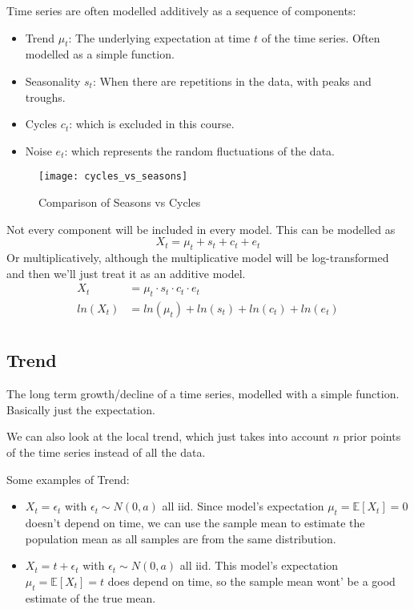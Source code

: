     Time series are often modelled additively as a sequence of components: 
    \begin{itemize} 
        \item Trend \(\mu_t\): The underlying expectation at time \(t\) of the time series. Often modelled as a simple function.
        \item Seasonality \(s_t\): When there are repetitions in the data, with peaks and troughs.
        \item Cycles \(c_t\): which is excluded in this course.
        \item Noise \(e_t\): which represents the random fluctuations of the data.
    \end{itemize} 
    \begin{figure}[t]
        \centering
        \texttt{[image: cycles\_vs\_seasons]}
        \caption{Comparison of Seasons vs Cycles}
    \end{figure}

    Not every component will be included in every model.
    This can be modelled as 
    \begin{equation*}
        X_t = \mu_t + s_t + c_t + e_t
    \end{equation*}
    Or multiplicatively, although the multiplicative model will be log-transformed and then we'll just treat it as an additive model.
    \begin{equation*}
        \begin{aligned}
            X_t &= \mu_t \cdot s_t \cdot c_t \cdot e_t \\
            ln(X_t) &= ln(\mu_t) + ln(s_t) + ln(c_t) + ln(e_t) \\
        \end{aligned}
    \end{equation*}
    \subsection{Trend}
    The long term growth/decline of a time series, modelled with a simple function. Basically just the expectation.

    We can also look at the local trend, which just takes into account \(n\) prior points of the time series instead of all the data.

    Some examples of Trend:
    \begin{itemize}
        \item \(X_t = \epsilon_t\) with \(\epsilon_t \sim N(0, a)\) all iid.
            Since model's expectation \(\mu_t = \mathbb{E}[X_t] = 0\) doesn't depend on time, 
            we can use the sample mean to estimate the population mean as all samples are from the same distribution.
        \item \(X_t = t + \epsilon_t \) with \(\epsilon_t \sim N(0, a)\) all iid.
            This model's expectation \(\mu_t = \mathbb{E}[X_t] = t\) does depend on time, so the sample mean wont' be a good estimate of the true mean.
    \end{itemize}

